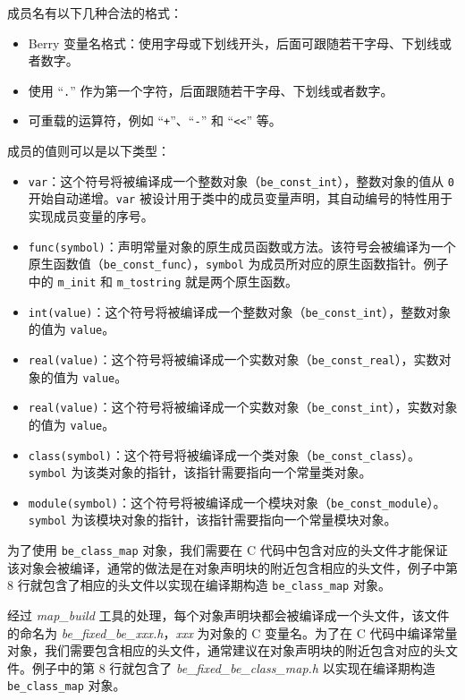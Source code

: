 成员名有以下几种合法的格式：
\begin{itemize}
    \item Berry 变量名格式：使用字母或下划线开头，后面可跟随若干字母、下划线或者数字。
    \item 使用 ``\texttt{.}'' 作为第一个字符，后面跟随若干字母、下划线或者数字。
    \item 可重载的运算符，例如 ``\texttt{+}''、``\texttt{-}'' 和 ``\texttt{<<}'' 等。
\end{itemize}
成员的值则可以是以下类型：
\begin{itemize}
    \item \texttt{var}：这个符号将被编译成一个整数对象（\texttt{be\_const\_int}），整数对象的值从 \texttt{0} 开始自动递增。\texttt{var} 被设计用于类中的成员变量声明，其自动编号的特性用于实现成员变量的序号。
    \item \texttt{func(symbol)}：声明常量对象的原生成员函数或方法。该符号会被编译为一个原生函数值（\texttt{be\_const\_func}），\texttt{symbol} 为成员所对应的原生函数指针。例子中的 \texttt{m\_init} 和 \texttt{m\_tostring} 就是两个原生函数。
    \item \texttt{int(value)}：这个符号将被编译成一个整数对象（\texttt{be\_const\_int}），整数对象的值为 \texttt{value}。
    \item \texttt{real(value)}：这个符号将被编译成一个实数对象（\texttt{be\_const\_real}），实数对象的值为 \texttt{value}。
    \item \texttt{real(value)}：这个符号将被编译成一个实数对象（\texttt{be\_const\_int}），实数对象的值为 \texttt{value}。
    \item \texttt{class(symbol)}：这个符号将被编译成一个类对象（\texttt{be\_const\_class}）。\texttt{symbol} 为该类对象的指针，该指针需要指向一个常量类对象。
    \item \texttt{module(symbol)}：这个符号将被编译成一个模块对象（\texttt{be\_const\_module}）。\texttt{symbol} 为该模块对象的指针，该指针需要指向一个常量模块对象。
\end{itemize}

为了使用 \texttt{be\_class\_map} 对象，我们需要在 C 代码中包含对应的头文件才能保证该对象会被编译，通常的做法是在对象声明块的附近包含相应的头文件，例子中第 8 行就包含了相应的头文件以实现在编译期构造 \texttt{be\_class\_map} 对象。

经过 \textsl{map\_build} 工具的处理，每个对象声明块都会被编译成一个头文件，该文件的命名为 \textsl{be\_fixed\_be\_xxx.h}，\textsl{xxx} 为对象的 C 变量名。为了在 C 代码中编译常量对象，我们需要包含相应的头文件，通常建议在对象声明块的附近包含对应的头文件。例子中的第 8 行就包含了 \textsl{be\_fixed\_be\_class\_map.h} 以实现在编译期构造 \texttt{be\_class\_map} 对象。

